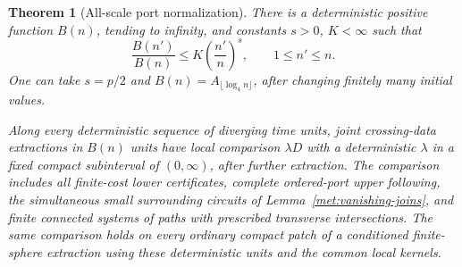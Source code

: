 \documentclass[11pt]{article}
\numberwithin{equation}{section}
\newtheorem{theorem}{Theorem}[section]
\theoremstyle{definition}
\theoremstyle{remark}
\newcommand{\1}{\mathbf 1}
\begin{document}
\begin{theorem}[All-scale port normalization]
\label{met:normalizers}
There is a deterministic positive function $B(n)$, tending to
infinity, and constants $s>0$, $K<\infty$ such that
\begin{equation}
 \frac{B(n')}{B(n)}\leq K\left(\frac{n'}n\right)^s,
 \qquad 1\leq n'\leq n.
 \label{met:polynomial-ratio}
\end{equation}
One can take $s=p/2$ and $B(n)=A_{\lfloor\log_4n\rfloor}$,
after changing finitely many initial values.

Along every deterministic sequence of diverging time units, joint
crossing-data extractions in $B(n)$ units have local comparison
$\lambda D$ with a deterministic $\lambda$ in a fixed compact
subinterval of $(0,\infty)$, after further extraction.  The
comparison includes all finite-cost lower certificates, complete
ordered-port upper following, the simultaneous small surrounding
circuits of Lemma~\ref{met:vanishing-joins}, and finite connected
systems of paths with prescribed transverse intersections.
The same comparison holds on every ordinary compact patch of a
conditioned finite-sphere extraction using these deterministic
units and the common local kernels.
\end{theorem}
\end{document}
